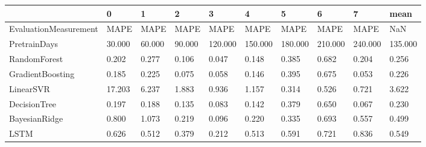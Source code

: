 \begin{tabular}{llllllllll}
\toprule
{} &      0 &      1 &      2 &       3 &       4 &       5 &       6 &       7 &    mean \\
\midrule
EvaluationMeasurement &   MAPE &   MAPE &   MAPE &    MAPE &    MAPE &    MAPE &    MAPE &    MAPE &     NaN \\
PretrainDays          & 30.000 & 60.000 & 90.000 & 120.000 & 150.000 & 180.000 & 210.000 & 240.000 & 135.000 \\
RandomForest          &  0.202 &  0.277 &  0.106 &   0.047 &   0.148 &   0.385 &   0.682 &   0.204 &   0.256 \\
GradientBoosting      &  0.185 &  0.225 &  0.075 &   0.058 &   0.146 &   0.395 &   0.675 &   0.053 &   0.226 \\
LinearSVR             & 17.203 &  6.237 &  1.883 &   0.936 &   1.157 &   0.314 &   0.526 &   0.721 &   3.622 \\
DecisionTree          &  0.197 &  0.188 &  0.135 &   0.083 &   0.142 &   0.379 &   0.650 &   0.067 &   0.230 \\
BayesianRidge         &  0.800 &  1.073 &  0.219 &   0.096 &   0.220 &   0.335 &   0.693 &   0.557 &   0.499 \\
LSTM                  &  0.626 &  0.512 &  0.379 &   0.212 &   0.513 &   0.591 &   0.721 &   0.836 &   0.549 \\
\bottomrule
\end{tabular}
